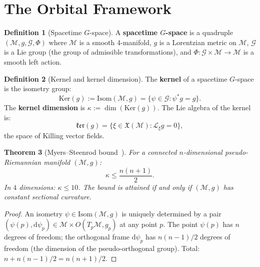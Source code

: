 \documentclass[12pt]{article}
\theoremstyle{plain}
\newtheorem{theorem}{Theorem}[section]
\theoremstyle{definition}
\newtheorem{definition}[theorem]{Definition}
\theoremstyle{remark}
\newcommand{\Isom}{\mathrm{Isom}}
\newcommand{\Ker}{\mathrm{Ker}}
\newcommand{\dd}{\mathrm{d}}
\begin{document}
\section{The Orbital Framework}
\label{sec:orbital}

\begin{definition}[Spacetime $G$-space]\label{def:gspace}
A \textbf{spacetime $G$-space} is a quadruple $(\mathcal{M}, g, \mathcal{G}, \Phi)$ where $\mathcal{M}$ is a smooth 4-manifold, $g$ is a Lorentzian metric on $\mathcal{M}$, $\mathcal{G}$ is a Lie group (the group of admissible transformations), and $\Phi: \mathcal{G} \times \mathcal{M} \to \mathcal{M}$ is a smooth left action.
\end{definition}

\begin{definition}[Kernel and kernel dimension]\label{def:kernel}
The \textbf{kernel} of a spacetime $G$-space is the isometry group:
\begin{equation}
\Ker(g) := \Isom(\mathcal{M}, g) = \{\psi \in \mathcal{G} : \psi^*g = g\}.
\end{equation}
The \textbf{kernel dimension} is $\kappa := \dim(\Ker(g))$. The Lie algebra of the kernel is:
\begin{equation}
\mathfrak{ker}(g) = \{\xi \in \mathfrak{X}(\mathcal{M}) : \mathcal{L}_\xi g = 0\},
\end{equation}
the space of Killing vector fields.
\end{definition}

\begin{theorem}[Myers--Steenrod bound~\cite{myers1939}]\label{thm:ms}
For a connected $n$-dimensional pseudo-Riemannian manifold $(\mathcal{M}, g)$:
\begin{equation}
\kappa \leq \frac{n(n+1)}{2}.
\end{equation}
In $4$ dimensions: $\kappa \leq 10$. The bound is attained if and only if $(\mathcal{M}, g)$ has constant sectional curvature.
\end{theorem}

\begin{proof}
An isometry $\psi \in \Isom(\mathcal{M}, g)$ is uniquely determined by a pair $(\psi(p), \dd\psi_p) \in \mathcal{M} \times O(T_p\mathcal{M}, g_p)$ at any point $p$. The point $\psi(p)$ has $n$ degrees of freedom; the orthogonal frame $\dd\psi_p$ has $n(n-1)/2$ degrees of freedom (the dimension of the pseudo-orthogonal group). Total: $n + n(n-1)/2 = n(n+1)/2$.
\end{proof}
\end{document}
